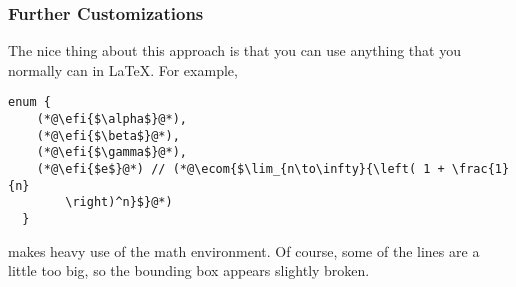 \documentclass{beamer}
\begin{document}
\begin{frame}[fragile]
  \frametitle{Further Customizations}

  The nice thing about this approach is that you can use anything that
  you normally can in \LaTeX.  For example,


\begin{lstlisting}[caption={Something a little different.}, label={lst:wacky}]
  enum {
    (*@\efi{$\alpha$}@*),
    (*@\efi{$\beta$}@*),
    (*@\efi{$\gamma$}@*),
    (*@\efi{$e$}@*) // (*@\ecom{$\lim_{n\to\infty}{\left( 1 + \frac{1}{n}
        \right)^n}$}@*)
  }
\end{lstlisting}

  \noindent
  makes heavy use of the math environment. Of course, some of the
  lines are a little too big, so the bounding box appears slightly broken.

  
\end{frame}
\end{document}
